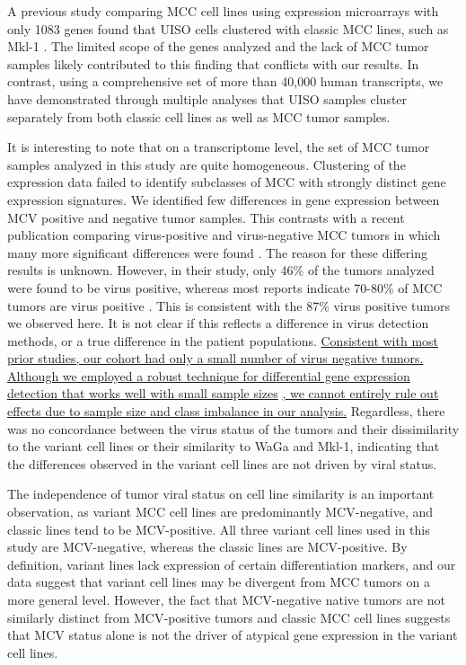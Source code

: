 \documentclass[10pt]{article}
\begin{document}
A previous study comparing MCC cell lines using expression microarrays with only 1083 genes found that UISO cells clustered with classic MCC lines, such as Mkl-1 \citep{VanGele2004Geneexpression}.
The limited scope of the genes analyzed and the lack of MCC tumor samples likely contributed to this finding that conflicts with our results.
In contrast, using a comprehensive set of more than 40,000 human transcripts, we have demonstrated through multiple analyses that UISO samples cluster separately from both classic cell lines as well as MCC tumor samples.

It is interesting to note that on a transcriptome level, the set of MCC tumor samples analyzed in this study are quite homogeneous.
Clustering of the expression data failed to identify subclasses of MCC with strongly distinct gene expression signatures.
We identified few differences in gene expression between MCV positive and negative tumor samples.
This contrasts with a recent publication comparing virus-positive and virus-negative MCC tumors in which many more significant differences were found \citep{Harms2013Distinct}.
The reason for these differing results is unknown.
However, in their study, only 46\% of the tumors analyzed were found to be virus positive, whereas most reports indicate 70-80\% of MCC tumors are virus positive \citep{Pulitzer2009Merkel,Feng2008Clonal}.
This is consistent with the 87\% virus positive tumors we observed here.
It is not clear if this reflects a difference in virus detection methods, or a true difference in the patient populations.
\uline{Consistent with most prior studies, our cohort had only a small number of virus negative tumors.}
\uline{Although we employed a robust technique for differential gene expression detection that works well with small sample sizes} \citep{Smyth2004Linear,Smyth2005Limma}\uline{, we cannot entirely rule out effects due to sample size and class imbalance in our analysis.}
Regardless, there was no concordance between the virus status of the tumors and their dissimilarity to the variant cell lines or their similarity to WaGa and Mkl-1, indicating that the differences observed in the variant cell lines are not driven by viral status.

The independence of tumor viral status on cell line similarity is an important observation, as variant MCC cell lines are predominantly MCV-negative, and classic lines tend to be MCV-positive. 
All three variant cell lines used in this study are MCV-negative, whereas the classic lines are MCV-positive.
By definition, variant lines lack expression of certain differentiation markers, and our data suggest that variant cell lines may be divergent from MCC tumors on a more general level. 
However, the fact that MCV-negative native tumors are not similarly distinct from MCV-positive tumors and classic MCC cell lines suggests that MCV status alone is not the driver of atypical gene expression in the variant cell lines.
\end{document}
